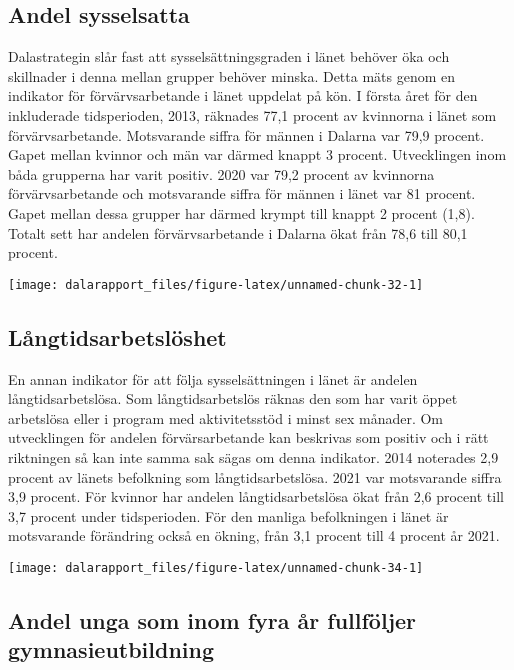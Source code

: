 \documentclass[
]{article}
\begin{document}
\hypertarget{andel-sysselsatta}{%
\subsection{Andel sysselsatta}\label{andel-sysselsatta}}

Dalastrategin slår fast att sysselsättningsgraden i länet behöver öka
och skillnader i denna mellan grupper behöver minska. Detta mäts genom
en indikator för förvärvsarbetande i länet uppdelat på kön. I första
året för den inkluderade tidsperioden, 2013, räknades 77,1 procent av
kvinnorna i länet som förvärvsarbetande. Motsvarande siffra för männen i
Dalarna var 79,9 procent. Gapet mellan kvinnor och män var därmed knappt
3 procent. Utvecklingen inom båda grupperna har varit positiv. 2020 var
79,2 procent av kvinnorna förvärvsarbetande och motsvarande siffra för
männen i länet var 81 procent. Gapet mellan dessa grupper har därmed
krympt till knappt 2 procent (1,8). Totalt sett har andelen
förvärvsarbetande i Dalarna ökat från 78,6 till 80,1 procent.

\begin{center}\texttt{[image: dalarapport\_files/figure-latex/unnamed-chunk-32-1]} \end{center}

\hypertarget{luxe5ngtidsarbetsluxf6shet}{%
\subsection{Långtidsarbetslöshet}\label{luxe5ngtidsarbetsluxf6shet}}

En annan indikator för att följa sysselsättningen i länet är andelen
långtidsarbetslösa. Som långtidsarbetslös räknas den som har varit öppet
arbetslösa eller i program med aktivitetsstöd i minst sex månader. Om
utvecklingen för andelen förvärsarbetande kan beskrivas som positiv och
i rätt riktningen så kan inte samma sak sägas om denna indikator. 2014
noterades 2,9 procent av länets befolkning som långtidsarbetslösa. 2021
var motsvarande siffra 3,9 procent. För kvinnor har andelen
långtidsarbetslösa ökat från 2,6 procent till 3,7 procent under
tidsperioden. För den manliga befolkningen i länet är motsvarande
förändring också en ökning, från 3,1 procent till 4 procent år 2021.

\begin{center}\texttt{[image: dalarapport\_files/figure-latex/unnamed-chunk-34-1]} \end{center}

\hypertarget{andel-unga-som-inom-fyra-uxe5r-fullfuxf6ljer-gymnasieutbildning}{%
\subsection{Andel unga som inom fyra år fullföljer
gymnasieutbildning}\label{andel-unga-som-inom-fyra-uxe5r-fullfuxf6ljer-gymnasieutbildning}}
\end{document}
